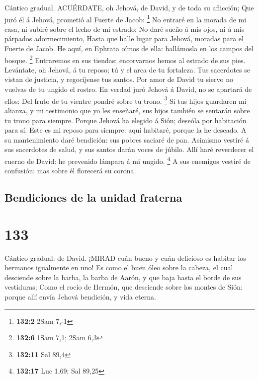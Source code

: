  Cántico gradual. ACUÉRDATE, oh Jehová, de David, y de toda
su aflicción;  Que juró él á Jehová, prometió al Fuerte de
Jacob: \footnote{\textbf{132:2} 2Sam 7,-1}  No entraré en la
morada de mi casa, ni subiré sobre el lecho de mi estrado; 
No daré sueño á mis ojos, ni á mis párpados adormecimiento, 
Hasta que halle lugar para Jehová, moradas para el Fuerte de Jacob.
 He aquí, en Ephrata oímos de ella: hallámosla en los campos
del bosque. \footnote{\textbf{132:6} 1Sam 7,1; 2Sam 6,3} 
Entraremos en sus tiendas; encorvarnos hemos al estrado de sus pies.
 Levántate, oh Jehová, á tu reposo; tú y el arca de tu
fortaleza.  Tus sacerdotes se vistan de justicia, y
regocíjense tus santos.  Por amor de David tu siervo no
vuelvas de tu ungido el rostro.  En verdad juró Jehová á
David, no se apartará de ellos: Del fruto de tu vientre pondré sobre tu
trono. \footnote{\textbf{132:11} Sal 89,4}  Si tus hijos
guardaren mi alianza, y mi testimonio que yo les enseñaré, sus hijos
también se sentarán sobre tu trono para siempre.  Porque
Jehová ha elegido á Sión; deseóla por habitación para sí. 
Este es mi reposo para siempre: aquí habitaré, porque la he deseado.
 A su mantenimiento daré bendición: sus pobres saciaré de
pan.  Asimismo vestiré á sus sacerdotes de salud, y sus
santos darán voces de júbilo.  Allí haré reverdecer el
cuerno de David: he prevenido lámpara á mi ungido. \footnote{\textbf{132:17}
  Luc 1,69; Sal 89,25}  A sus enemigos vestiré de
confusión: mas sobre él florecerá su corona.

\hypertarget{bendiciones-de-la-unidad-fraterna}{%
\subsection{Bendiciones de la unidad
fraterna}\label{bendiciones-de-la-unidad-fraterna}}

\hypertarget{section-132}{%
\section{133}\label{section-132}}

 Cántico gradual: de David. ¡MIRAD cuán bueno y cuán
delicioso es habitar los hermanos igualmente en uno!  Es
como el buen óleo sobre la cabeza, el cual desciende sobre la barba, la
barba de Aarón, y que baja hasta el borde de sus vestiduras;
 Como el rocío de Hermón, que desciende sobre los montes de
Sión: porque allí envía Jehová bendición, y vida eterna.

